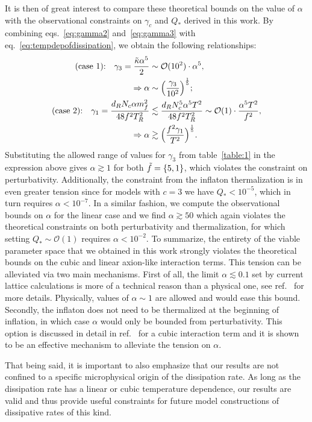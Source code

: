 \documentclass[a4paper,11pt]{article}
\begin{document}
It is then of great interest to compare these theoretical bounds on the value of $\alpha$ with the observational constraints on $\gamma_c$ and $Q_{*}$ derived in this work. By combining eqs.~\eqref{eq:gamma2} and~\eqref{eq:gamma3} with eq.~\eqref{eq:tempdepofdissipation}, we obtain the following relationships:
\begin{align}
    \text{(case 1):} \quad \gamma_3=\frac{\Tilde{\kappa} \alpha^5}{2}&\sim \mathcal{O}(10^2)\cdot \alpha^5, \\
    \Rightarrow \alpha &\sim \Big(\frac{ \gamma_3}{10^2}\Big)^{\frac{1}{5}}; \\
    \text{(case 2):} \quad \gamma_1=\frac{d_R N_c \alpha m_f^2}{48 f^2 T_R^2} &\lesssim \frac{d_R N_c^5 \alpha^5 T^2}{48 f^2 T_R^2} \sim \mathcal{O}(1)\cdot \frac{\alpha^5 T^2}{f^2}, \\
    \Rightarrow \alpha &\gtrsim \Big(\frac{f^2 \gamma_1}{T^2}\Big)^{\frac{1}{5}}. \label{eq:alpha_2} 
\end{align}
Substituting the allowed range of values for $\gamma_3$ from table~\ref{table:1} in the expression above gives $\alpha \gtrsim 1$ for both $\Tilde{f}=\{5,1\}$, which violates the constraint on perturbativity. Additionally, the constraint from the inflaton thermalization is in even greater tension since for models with $c=3$ we have $Q_{*}<10^{-5}$, which in turn requires $\alpha<10^{-7}$. In a similar fashion, we compute the observational bounds on $\alpha$ for the linear case and we find $\alpha \gtrsim 50$ which again violates the theoretical constraints on both perturbativity and thermalization, for which setting $Q_{*}\sim \mathcal{O}(1)$ requires $\alpha<10^{-2}$. To summarize, the entirety of the viable parameter space that we obtained in this work strongly violates the theoretical bounds on the cubic and linear axion-like interaction terms. This tension can be alleviated via two main mechanisms. First of all, the limit $\alpha\lesssim 0.1$ set by current lattice calculations is more of a technical reason than a physical one, see ref.~\cite{Moore:2010jd} for more details. Physically, values of $\alpha \sim 1$ are allowed and would ease this bound. Secondly, the inflaton does not need to be thermalized at the beginning of inflation, in which case $\alpha$ would only be bounded from perturbativity. This option is discussed in detail in ref.~\cite{Reyimuaji:2020bkm} for a cubic interaction term and it is shown to be an effective mechanism to alleviate the tension on $\alpha$. 

That being said, it is important to also emphasize that our results are not confined to a specific microphysical origin of the dissipation rate. As long as the dissipation rate has a linear or cubic temperature dependence, our results are valid and thus provide useful constraints for future model constructions of dissipative rates of this kind.
\end{document}
